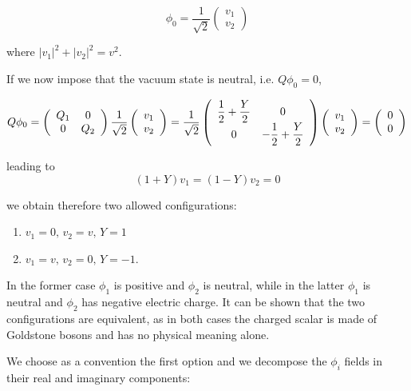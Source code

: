 \begin{equation}
\phi_0 = \dfrac{1}{\sqrt{2}} \left(\begin{array}{c}v_1 \\v_2\end{array}\right)
\end{equation}

where $|v_1|^2 + |v_2|^2 = v^2$.

If we now impose that the vacuum state is neutral, i.e. $Q\phi_0 = 0$, 

\begin{equation}
Q\phi_0 = \left(\begin{array}{cc}Q_1 & 0 \\0 & Q_2\end{array}\right)   \dfrac{1}{\sqrt{2}} \left(\begin{array}{c}v_1 \\v_2\end{array}\right) = \dfrac{1}{\sqrt{2}} \left(\begin{array}{cc}\dfrac{1}{2} + \dfrac{Y}{2} & 0 \\0 & -\dfrac{1}{2} + \dfrac{Y}{2}\end{array}\right) \left(\begin{array}{c}v_1 \\v_2\end{array}\right) = \left(\begin{array}{c}0 \\0\end{array}\right)
\end{equation}

leading to
\begin{equation}
(1+Y)v_1 = (1-Y)v_2 = 0
\end{equation}

we obtain therefore two allowed configurations:

\begin{enumerate}
\item $v_1 = 0, \, v_2 = v, \, Y = 1$
\item $v_1 = v, \, v_2 = 0, \, Y = -1$.
\end{enumerate}

In the former case $\phi_1$ is positive and $\phi_2$ is neutral, while in the latter $\phi_1$ is neutral and $\phi_2$ has negative electric charge. It can be shown that the two configurations are equivalent, as in both cases the charged scalar is made of Goldstone bosons and has no physical meaning alone.

We choose as a convention the first option and we decompose the $\phi_i$ fields in their real and imaginary components:

